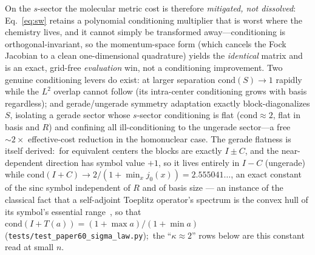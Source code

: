 \documentclass[aps,pra,twocolumn,superscriptaddress,longbibliography]{revtex4-2}
\begin{document}
On the $s$-sector the molecular metric cost is therefore \emph{mitigated, not dissolved}:
Eq.~\eqref{eq:sw} retains a polynomial conditioning multiplier that is worst where
the chemistry lives, and it cannot simply be transformed away---conditioning is
orthogonal-invariant, so the momentum-space form (which cancels the Fock Jacobian
to a clean one-dimensional quadrature) yields the \emph{identical} matrix and is
an exact, grid-free \emph{evaluation} win, not a conditioning improvement.  Two
genuine conditioning levers do exist: at larger separation $\mathrm{cond}(S)\to1$
rapidly while the $L^2$ overlap cannot follow (its intra-center conditioning grows
with basis regardless); and gerade/ungerade symmetry adaptation exactly
block-diagonalizes $S$, isolating a gerade sector whose $s$-sector conditioning is flat
($\mathrm{cond}\approx2$, flat in basis and $R$) and confining all
ill-conditioning to the ungerade sector---a free ${\sim}2\times$ effective-cost
reduction in the homonuclear case.  The gerade flatness is itself derived:\ for
equivalent centers the blocks are exactly $I\pm C$, and the near-dependent
direction has symbol value $+1$, so it lives entirely in $I-C$ (ungerade) while
$\mathrm{cond}(I+C)\to 2/(1+\min_x j_0(x))=2.555041\ldots$, an exact constant of
the sinc symbol independent of $R$ and of basis size --- an instance of the
classical fact that a self-adjoint Toeplitz operator's spectrum is the convex
hull of its symbol's essential range~\cite{hartman_wintner1954}, so that
$\mathrm{cond}(I+T(a))=(1+\max a)/(1+\min a)$
(\texttt{tests/test\_paper60\_sigma\_law.py});\ the ``$\kappa\approx2$'' rows
below are this constant read at small $n$.
\end{document}
